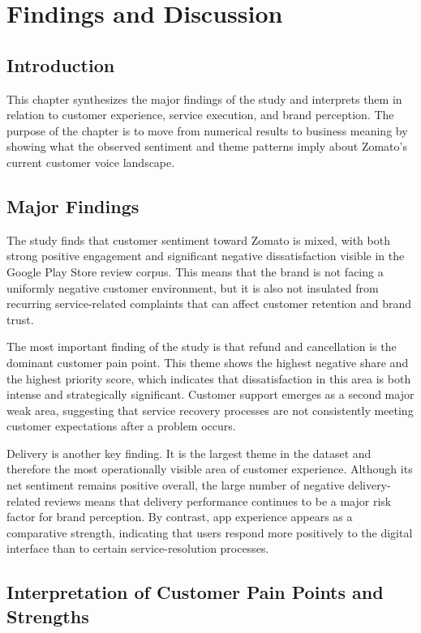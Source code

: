 \chapter{Findings and Discussion}

\section{Introduction}

This chapter synthesizes the major findings of the study and interprets them in relation to customer experience, service execution, and brand perception. The purpose of the chapter is to move from numerical results to business meaning by showing what the observed sentiment and theme patterns imply about Zomato's current customer voice landscape.

\section{Major Findings}

The study finds that customer sentiment toward Zomato is mixed, with both strong positive engagement and significant negative dissatisfaction visible in the Google Play Store review corpus. This means that the brand is not facing a uniformly negative customer environment, but it is also not insulated from recurring service-related complaints that can affect customer retention and brand trust.

The most important finding of the study is that refund and cancellation is the dominant customer pain point. This theme shows the highest negative share and the highest priority score, which indicates that dissatisfaction in this area is both intense and strategically significant. Customer support emerges as a second major weak area, suggesting that service recovery processes are not consistently meeting customer expectations after a problem occurs.

Delivery is another key finding. It is the largest theme in the dataset and therefore the most operationally visible area of customer experience. Although its net sentiment remains positive overall, the large number of negative delivery-related reviews means that delivery performance continues to be a major risk factor for brand perception. By contrast, app experience appears as a comparative strength, indicating that users respond more positively to the digital interface than to certain service-resolution processes.

\section{Interpretation of Customer Pain Points and Strengths}

